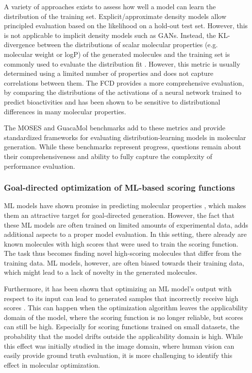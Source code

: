 A variety of approaches exists to assess how well a model can learn the distribution of the training
set. Explicit/approximate density models allow principled evaluation based on the likelihood on a
hold-out test set. However, this is not applicable to implicit density models such as \acp{GAN}.
Instead, the KL-divergence between the distributions of scalar molecular properties (e.g. molecular
weight or logP) of the generated molecules and the training set is commonly used to evaluate the
distribution fit \citep{brownGuacaMolBenchmarkingModels2019,polykovskiyMolecularSetsMOSES2020}.
However, this metric is usually determined using a limited number of properties and does not capture
correlations between them. The \ac{FCD} \citep{preuerFrechetChemNetDistance2018}
provides a more comprehensive evaluation, by comparing the distributions of the activations of a
neural network trained to predict bioactivities and has been shown to be sensitive to distributional
differences in many molecular properties.

The MOSES \citep{polykovskiyMolecularSetsMOSES2020} and GuacaMol
\citep{brownGuacaMolBenchmarkingModels2019} benchmarks add to these metrics and provide standardized
frameworks for evaluating distribution-learning models in molecular generation. While these
benchmarks represent progress, questions remain about their comprehensiveness and ability to fully
capture the complexity of performance evaluation.

\subsubsection{Goal-directed optimization of ML-based scoring functions}
\ac{ML} models have shown promise in predicting molecular properties
\citep{mayrDeepToxToxicityPrediction2016,klambauerMachineLearningDrug2019,vamathevanApplicationsMachineLearning2019,chenRiseDeepLearning2018,stokesDeepLearningApproach2020},
which makes them an attractive target for goal-directed generation. However, the fact that these
\ac{ML} models are often trained on limited amounts of experimental data, adds additional aspects
to a proper model evaluation. In this setting, there already are known molecules with high scores
that were used to train the scoring function. The task thus becomes finding novel
high-scoring molecules that differ from the training data. \ac{ML} models, however, are
often biased towards their training data, which might lead to a lack of novelty in the generated
molecules.

Furthermore, it has been shown that optimizing an \ac{ML} model's output with respect to its input
can lead to generated samples that incorrectly receive high scores
\citep{szegedyIntriguingPropertiesNeural2014,goodfellowExplainingHarnessingAdversarial2015}. This
can happen when the optimization algorithm leaves the applicability domain of the model, where the
scoring function is no longer reliable, but scores can still be high. Especially for scoring
functions trained on small datasets, the probability that the model drifts outside the applicability
domain is high. While this effect was initially studied in the image domain, where human vision can
easily provide ground truth evaluation, it is more challenging to identify this effect in molecular
optimization.

